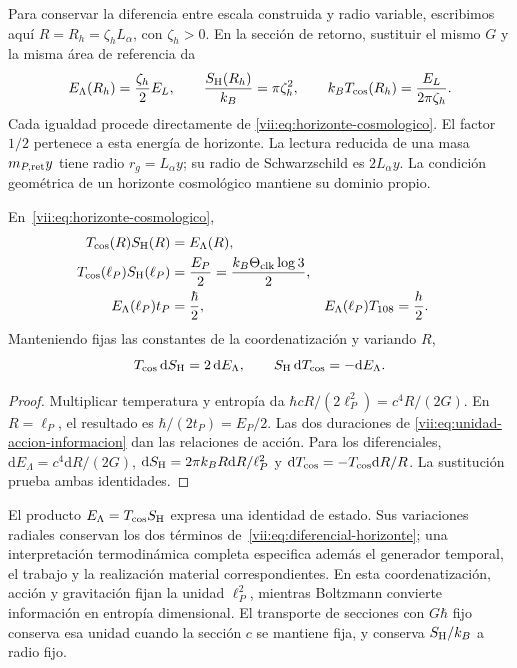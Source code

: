 Para conservar la diferencia entre escala construida y radio variable,
escribimos aquí \(R=R_h=\zeta_hL_\alpha\), con \(\zeta_h>0\).
En la sección de retorno, sustituir el mismo \(G\) y la misma área
de referencia da
\[
 E_\Lambda(R_h)=\frac{\zeta_h}{2}E_L,\qquad
 \frac{S_{\rm H}(R_h)}{k_B}=\pi\zeta_h^2,\qquad
 k_BT_{\rm cos}(R_h)=\frac{E_L}{2\pi\zeta_h}.
\]
Cada igualdad procede directamente de
\eqref{vii:eq:horizonte-cosmologico}. El factor \(1/2\) pertenece
a esta energía de horizonte. La lectura reducida de una masa
\(m_{P,\rm ret}y\) tiene radio \(r_g=L_\alpha y\); su radio de
Schwarzschild es \(2L_\alpha y\). La condición geométrica de un
horizonte cosmológico mantiene su dominio propio.

\begin{theorem}
\label{vii:thm:celda-media-accion}
En~\eqref{vii:eq:horizonte-cosmologico},
\begin{align}
 T_{\rm cos}(R)S_{\rm H}(R)&=E_\Lambda(R),\\
 T_{\rm cos}(\ell_P)S_{\rm H}(\ell_P)
 &=\frac{E_P}{2}=\frac{k_B\Theta_{\rm clk}\log3}{2},\\
 E_\Lambda(\ell_P)t_P&=\frac{\hbar}{2},&
 E_\Lambda(\ell_P)T_{108}&=\frac h2.
 \label{vii:eq:media-accion-horizonte}
\end{align}
Manteniendo fijas las constantes de la coordenatización y variando \(R\),
\begin{equation}
 T_{\rm cos}\,\mathrm dS_{\rm H}=2\,\mathrm dE_\Lambda,
 \qquad S_{\rm H}\,\mathrm dT_{\rm cos}=-\mathrm dE_\Lambda.
 \label{vii:eq:diferencial-horizonte}
\end{equation}
\end{theorem}
\begin{proof}
Multiplicar temperatura y entropía da
\(\hbar cR/(2\ell_P^2)=c^4R/(2G)\).
En \(R=\ell_P\), el resultado es
\(\hbar/(2t_P)=E_P/2\). Las dos duraciones de
\eqref{vii:eq:unidad-accion-informacion} dan las relaciones de acción.
Para los diferenciales,
\(\mathrm dE_\Lambda=c^4\mathrm dR/(2G)\),
\(\mathrm dS_{\rm H}=2\pi k_BR\mathrm dR/\ell_P^2\) y
\(\mathrm dT_{\rm cos}=-T_{\rm cos}\mathrm dR/R\).
La sustitución prueba ambas identidades.
\end{proof}

El producto \(E_\Lambda=T_{\rm cos}S_{\rm H}\) expresa una
identidad de estado. Sus variaciones radiales conservan los dos términos
de~\eqref{vii:eq:diferencial-horizonte}; una interpretación termodinámica
completa especifica además el generador temporal, el trabajo y la
realización material correspondientes. En esta coordenatización, acción y
gravitación fijan la unidad \(\ell_P^2\), mientras Boltzmann convierte
información en entropía dimensional. El transporte de secciones con
\(G\hbar\) fijo conserva esa unidad cuando la sección \(c\) se
mantiene fija, y conserva \(S_{\rm H}/k_B\) a radio fijo.


